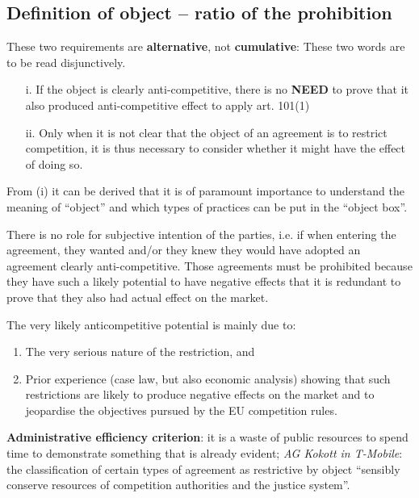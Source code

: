 \newpage
    \subsection{Definition of object – ratio of the prohibition}

        These two requirements are \textbf{alternative}, not \textbf{cumulative}: These two words are to be read disjunctively.
        
        \begin{itemize}
            \item[i.] If the object is clearly anti-competitive, there is no \textbf{NEED} to prove that it also produced anti-competitive effect to apply art. 101(1)
            \item[ii.] Only when it is not clear that the object of an agreement is to restrict competition, it is thus necessary to consider whether it might have the effect of doing so.
        \end{itemize}
        
        From (i) it can be derived that it is of paramount importance to understand the meaning of “object” and which types of practices can be put in the “object box”.

        There is no role for subjective intention of the parties, i.e. if when entering the agreement, they wanted and/or they knew they would have adopted an agreement clearly anti-competitive. Those agreements must be prohibited because they have such a likely potential to have negative effects that it is redundant to prove that they also had actual effect on the market.

        The very likely anticompetitive potential is mainly due to: 
        \begin{enumerate}[label=(\alph*)]
            \item The very serious nature of the restriction, and
            \item Prior experience (case law, but also economic analysis) showing that such restrictions are likely to produce negative effects on the market and to jeopardise the objectives pursued by the EU competition rules.
        \end{enumerate}
        
        \textbf{Administrative efficiency criterion}: it is a waste of public resources to spend time to demonstrate something that is already evident; \textit{AG Kokott in T-Mobile}: the classification of certain types of agreement as restrictive by object “sensibly conserve resources of competition authorities and the justice system”.
        

